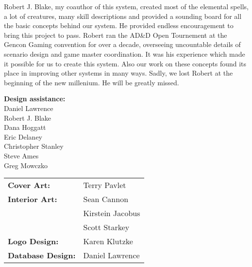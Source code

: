 Robert J. Blake, my coauthor of this system, created most of the elemental spells, a lot of creatures, many skill descriptions and provided a sounding board for all the basic concepts behind our system. He provided endless encouragement to bring this project to pass. Robert ran the AD\&D Open Tournement at the Gencon Gaming convention for over a decade, overseeing uncountable details of scenario design and game master coordination. It was his experience which made it possible for us to create this system. Also our work on these concepts found its place in improving other systems in many ways. Sadly, we lost Robert at the beginning of the new millenium. He will be greatly missed.

\textbf{Design assistance:}\\
Daniel Lawrence\\
Robert J. Blake\\
Dana Hoggatt\\
Eric Delaney\\
Christopher Stanley\\
Steve Ames\\
Greg Mowczko\\

\begin{tabular}{ l l }
\textbf{Cover Art:} & Terry Pavlet\\
\textbf{Interior Art:} & Sean Cannon\\
 & Kirstein Jacobus\\
 & Scott Starkey\\
\textbf{Logo Design:} & Karen Klutzke\\
\textbf{Database Design:} & Daniel Lawrence\\
\end{tabular}

